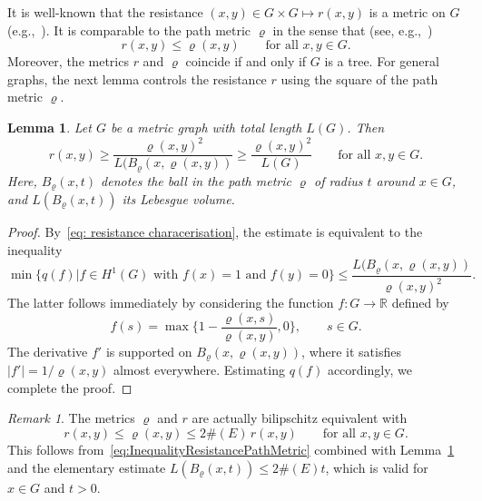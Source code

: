 \documentclass[reqno]{amsart}
\theoremstyle{plain}
\newtheorem{lem}[thm]{Lemma}
\theoremstyle{definition}
\theoremstyle{remark}
\newtheorem{rmk}[thm]{Remark}
\numberwithin{equation}{section}
\newcommand{\R}{\mathbb{R}}     %
\begin{document}
It is well-known that the resistance $(x,y)\in G\times G \mapsto r(x,y)$ is a metric on $G$ (e.g.,~\cite[Lemma~3.5]{jp23}). It is comparable to the path metric $\varrho$ in the sense that (see, e.g.,~\cite[Lemma~3.52]{jp23})
\begin{equation} \label{eq:InequalityResistancePathMetric}
	r(x,y) \le \varrho(x,y) \qquad \text{for all $x,y \in G$}.
\end{equation}
Moreover, the metrics $r$ and $\varrho$ coincide if and only if $G$ is a tree. For general graphs, the next lemma controls the resistance $r$ using the square of the path metric $\varrho$.
\begin{lem} \label{lem:EasyUpperEstimate}
	Let $G$ be a metric graph with total length $L(G)$. Then
	\[
	r(x,y)\ge \frac{\varrho(x,y)^2}{L(B_\varrho(x, \varrho(x,y))} \ge \frac{\varrho(x,y)^2}{L(G)} \qquad \text{for all $x,y\in G$}.
	\]
	Here, $B_\varrho(x, t)$ denotes the ball in the path metric $\varrho$ of radius $t$ around $x \in G$, and $L(B_\varrho(x,t))$ its Lebesgue volume.
\end{lem}
\begin{proof}
	By~\eqref{eq: resistance characerisation}, the estimate is equivalent to the inequality
	\[
	\min\{ q(f) | f \in H^1(G) \text{ with $f(x) = 1$ and $f(y) = 0$} \} \le \frac{L(B_\varrho(x, \varrho(x,y))}{\varrho(x,y)^2}.
	\]
	The latter follows immediately by considering the function $f\colon G \to \R$ defined by
	\[
	f(s) =\max\{1 - \frac{\varrho(x,s)}{\varrho(x,y)}, 0\},  \qquad s \in G.
	\]
	The derivative $f'$ is supported on $B_\varrho(x, \varrho(x,y))$, where it satisfies $|f'| = 1/\varrho(x,y)$ almost everywhere. Estimating $q(f)$ accordingly, we complete the proof.
\end{proof}
\begin{rmk}
	The metrics $\varrho$ and $r$ are actually bilipschitz equivalent with
	\[
	r(x,y) \le \varrho(x,y) \le 2 \#(E) \, r(x,y) \qquad \text{for all $x,y \in G$}.
	\]
	This follows from~\eqref{eq:InequalityResistancePathMetric} combined with Lemma~\ref{lem:EasyUpperEstimate} and the elementary estimate $L(B_\varrho(x, t)) \le 2 \#(E) t$, which is valid for $x \in G$ and $t > 0$.
\end{rmk}
\end{document}
